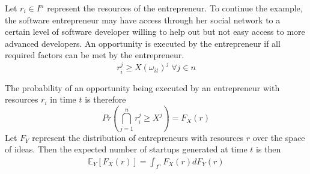 \documentclass[12pt]{article}
\begin{document}
Let $r_i \in I^n$ represent the resources of the entrepreneur. To continue the example, the software entrepreneur may have access through her social network to a certain level of software developer willing to help out but not easy access to more advanced developers. An opportunity is executed by the entrepreneur if all required factors can be met by the entrepreneur. 
$$r_i^j \ge X(\omega_{it})^j \; \forall j \in n$$

\begin{comment}
We call an idea \textit{unbounded} for an individual if the idea can be executed and \textit{single bounded} on dimension $k$ if
$$\alpha_i^k = X(\omega{it})^k \wedge  \alpha_i^j > X(\omega{it})^j \; \forall j \ne k \in n$$
\end{comment}

The probability of an opportunity being executed by an entrepreneur with resources $r_i$ in time $t$ is therefore 
$$Pr\left(\bigcap _{j=1}^n  r_i^j \ge X^j\right) = F_X(r)$$
Let $F_Y$ represent the distribution of entrepreneurs with resources $r$ over the space of ideas. Then the expected number of startups generated at time $t$ is then 
\begin{align}
\mathbb{E}_{Y}[F_X(r)]=\int_{I^n} F_X(r) dF_Y(r)
\end{align}
\end{document}
